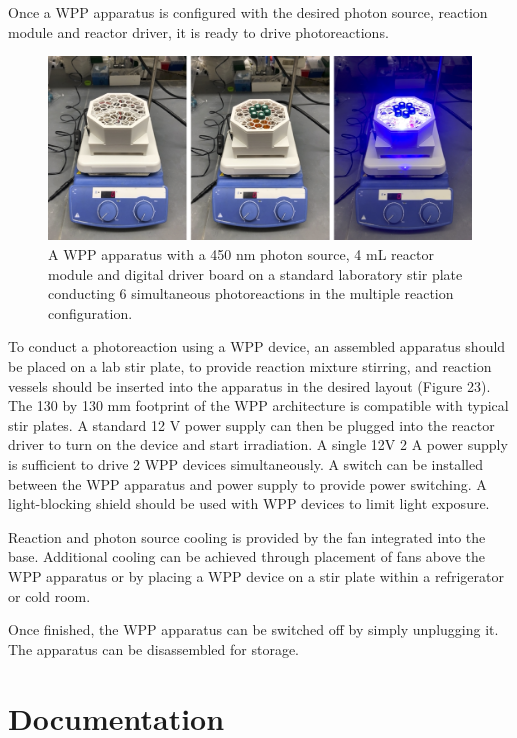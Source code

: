 \documentclass[11pt]{article}
\let\stdsection\section
\renewcommand\section{\clearpage\stdsection}
\begin{document}
Once a WPP apparatus is configured with the desired photon source, reaction module and reactor driver, it is ready to drive photoreactions.

\begin{figure}[H]
  \centering
  \includegraphics[width=\textwidth]{"./fign8.png"}
  \caption{A WPP apparatus with a 450 nm photon source, 4 mL reactor module and digital driver board on a standard laboratory stir plate conducting 6 simultaneous photoreactions in the multiple reaction configuration.}
\end{figure}

To conduct a photoreaction using a WPP device, an assembled apparatus should be placed on a lab stir plate, to provide reaction mixture stirring, and reaction vessels should be inserted into the apparatus in the desired layout (Figure 23).
The 130 by 130 mm footprint of the WPP architecture is compatible with typical stir plates.
A standard 12 V power supply can then be plugged into the reactor driver to turn on the device and start irradiation.
A single 12V 2 A power supply is sufficient to drive 2 WPP devices simultaneously.
A switch can be installed between the WPP apparatus and power supply to provide power switching.
A light-blocking shield should be used with WPP devices to limit light exposure.


Reaction and photon source cooling is provided by the fan integrated into the base.
Additional cooling can be achieved through placement of fans above the WPP apparatus or by placing a WPP device on a stir plate within a refrigerator or cold room.

Once finished, the WPP apparatus can be switched off by simply unplugging it. The apparatus can be disassembled for storage.

\section{Documentation}
\end{document}
